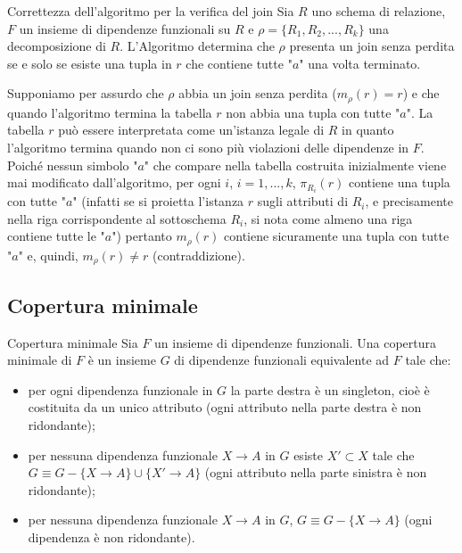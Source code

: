 \begin{Thm}{Correttezza dell'algoritmo per la verifica del join}{}
    Sia $R$ uno schema di relazione, $F$ un insieme di dipendenze funzionali su $R$ e $\rho=\{R_1, R_2,...,R_k\}$ una decomposizione di $R$. L'Algoritmo determina che $\rho$ presenta un join senza perdita se e solo se esiste una tupla in $r$ che contiene tutte "$a$" una volta terminato.

    \begin{demonstration}
        Supponiamo per assurdo che $\rho$ abbia un join senza perdita ($m_\rho (r)= r$) e che quando l'algoritmo termina la tabella $r$ non abbia una tupla con tutte "$a$". La tabella $r$ può essere interpretata come un'istanza legale di $R$ in quanto l'algoritmo termina quando non ci sono più violazioni delle dipendenze in $F$. Poiché nessun simbolo "$a$" che compare nella tabella costruita inizialmente viene mai modificato dall'algoritmo, per ogni $i$, $i=1,...,k$, $\pi_{R_i}(r)$ contiene una tupla con tutte "$a$" (infatti se si proietta l'istanza $r$ sugli attributi di $R_i$, e precisamente nella riga corrispondente al sottoschema $R_i$, si nota come almeno una riga contiene tutte le "$a$") pertanto $m_\rho (r)$ contiene sicuramente una tupla con tutte "$a$" e, quindi, $m_\rho (r)\neq r$ (contraddizione).
    \end{demonstration}
\end{Thm}

\subsection{Copertura minimale}
\begin{Definition}{Copertura minimale}{}
    Sia $F$ un insieme di dipendenze funzionali. Una copertura minimale di $F$ è un insieme $G$ di dipendenze funzionali equivalente ad $F$ tale che:
    \begin{itemize}
        \item per ogni dipendenza funzionale in $G$ la parte destra è un singleton, cioè è costituita da un unico attributo (ogni attributo nella parte destra è non ridondante);
        \item per nessuna dipendenza funzionale $X\to A$ in $G$ esiste $X'\subset X$ tale che $G\equiv G-\{X\to A\}\cup\{X'\to A\}$ (ogni attributo nella parte sinistra è non ridondante);
        \item per nessuna dipendenza funzionale $X\to A$ in $G$, $G\equiv G-\{X\to A\}$ (ogni dipendenza è non ridondante).
    \end{itemize}
\end{Definition}

